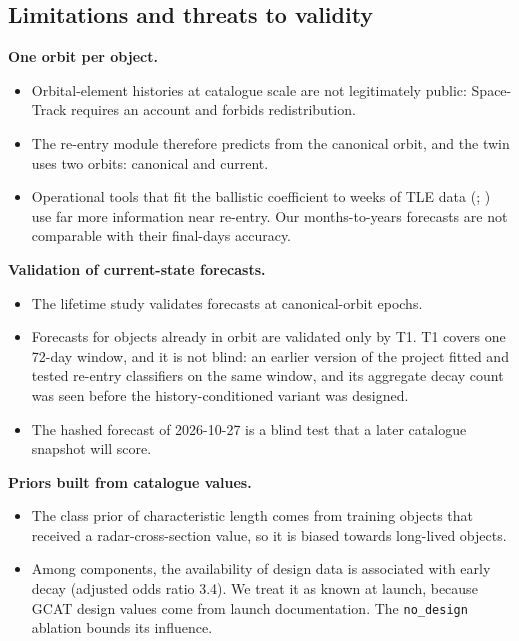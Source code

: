 \documentclass[
]{article}
\providecommand{\tightlist}{%
  \setlength{\itemsep}{0pt}\setlength{\parskip}{0pt}}
\begin{document}
\subsection{Limitations and threats to validity}\label{sec:limits}

\textbf{One orbit per object.}

\begin{itemize}
\tightlist
\item
  Orbital-element histories at catalogue scale are not legitimately
  public: Space-Track requires an account and forbids redistribution.
\item
  The re-entry module therefore predicts from the canonical orbit, and
  the twin uses two orbits: canonical and current.
\item
  Operational tools that fit the ballistic coefficient to weeks of TLE
  data (;
  ) use far
  more information near re-entry. Our months-to-years forecasts are not
  comparable with their final-days accuracy.
\end{itemize}

\textbf{Validation of current-state forecasts.}

\begin{itemize}
\tightlist
\item
  The lifetime study validates forecasts at canonical-orbit epochs.
\item
  Forecasts for objects already in orbit are validated only by T1. T1
  covers one 72-day window, and it is not blind: an earlier version of
  the project fitted and tested re-entry classifiers on the same window,
  and its aggregate decay count was seen before the history-conditioned
  variant was designed.
\item
  The hashed forecast of 2026-10-27 is a blind test that a later
  catalogue snapshot will score.
\end{itemize}

\textbf{Priors built from catalogue values.}

\begin{itemize}
\tightlist
\item
  The class prior of characteristic length comes from training objects
  that received a radar-cross-section value, so it is biased towards
  long-lived objects.
\item
  Among components, the availability of design data is associated with
  early decay (adjusted odds ratio 3.4). We treat it as known at launch,
  because GCAT design values come from launch documentation. The
  \texttt{no\_design} ablation bounds its influence.
\end{itemize}
\end{document}
